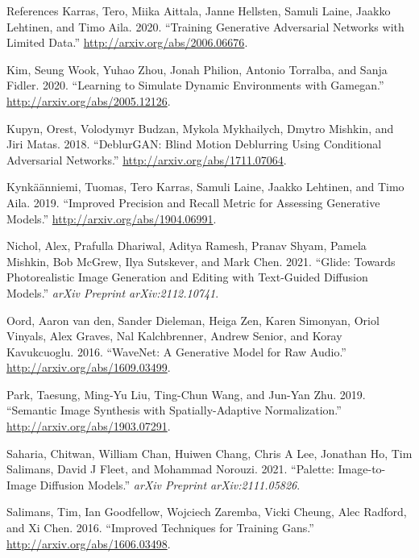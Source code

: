 \begin{frame}[allowframebreaks]{References}
\leavevmode\hypertarget{ref-karras2020training}{}%
Karras, Tero, Miika Aittala, Janne Hellsten, Samuli Laine, Jaakko
Lehtinen, and Timo Aila. 2020. ``Training Generative Adversarial
Networks with Limited Data.'' \url{http://arxiv.org/abs/2006.06676}.

\leavevmode\hypertarget{ref-kim2020learning}{}%
Kim, Seung Wook, Yuhao Zhou, Jonah Philion, Antonio Torralba, and Sanja
Fidler. 2020. ``Learning to Simulate Dynamic Environments with
Gamegan.'' \url{http://arxiv.org/abs/2005.12126}.

\leavevmode\hypertarget{ref-kupyn2018deblurgan}{}%
Kupyn, Orest, Volodymyr Budzan, Mykola Mykhailych, Dmytro Mishkin, and
Jiri Matas. 2018. ``DeblurGAN: Blind Motion Deblurring Using Conditional
Adversarial Networks.'' \url{http://arxiv.org/abs/1711.07064}.

\leavevmode\hypertarget{ref-kynkuxe4uxe4nniemi2019improved}{}%
Kynkäänniemi, Tuomas, Tero Karras, Samuli Laine, Jaakko Lehtinen, and
Timo Aila. 2019. ``Improved Precision and Recall Metric for Assessing
Generative Models.'' \url{http://arxiv.org/abs/1904.06991}.

\leavevmode\hypertarget{ref-nichol2021glide}{}%
Nichol, Alex, Prafulla Dhariwal, Aditya Ramesh, Pranav Shyam, Pamela
Mishkin, Bob McGrew, Ilya Sutskever, and Mark Chen. 2021. ``Glide:
Towards Photorealistic Image Generation and Editing with Text-Guided
Diffusion Models.'' \emph{arXiv Preprint arXiv:2112.10741}.

\leavevmode\hypertarget{ref-oord2016wavenet}{}%
Oord, Aaron van den, Sander Dieleman, Heiga Zen, Karen Simonyan, Oriol
Vinyals, Alex Graves, Nal Kalchbrenner, Andrew Senior, and Koray
Kavukcuoglu. 2016. ``WaveNet: A Generative Model for Raw Audio.''
\url{http://arxiv.org/abs/1609.03499}.

\leavevmode\hypertarget{ref-park2019semantic}{}%
Park, Taesung, Ming-Yu Liu, Ting-Chun Wang, and Jun-Yan Zhu. 2019.
``Semantic Image Synthesis with Spatially-Adaptive Normalization.''
\url{http://arxiv.org/abs/1903.07291}.

\leavevmode\hypertarget{ref-saharia2021palette}{}%
Saharia, Chitwan, William Chan, Huiwen Chang, Chris A Lee, Jonathan Ho,
Tim Salimans, David J Fleet, and Mohammad Norouzi. 2021. ``Palette:
Image-to-Image Diffusion Models.'' \emph{arXiv Preprint
arXiv:2111.05826}.

\leavevmode\hypertarget{ref-salimans2016improved}{}%
Salimans, Tim, Ian Goodfellow, Wojciech Zaremba, Vicki Cheung, Alec
Radford, and Xi Chen. 2016. ``Improved Techniques for Training Gans.''
\url{http://arxiv.org/abs/1606.03498}.


\end{frame}
